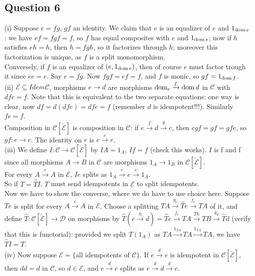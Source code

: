 \documentclass[a4paper]{article}
\begin{document}
\subsection{Question 6}
(i) Suppose $e = fg$, $gf$ an identity. We claim that $e$ is an equalizer of $e$ and $1_{\operatorname{dom} e}$: we have $ef = fgf = f$, so $f$ has equal composites with $e$ and $1_{\operatorname{dom} e}$; now if $h$ satisfies $eh = h$, then $h = fgh$, so it factorizes through $h$; moreover this factorization is unique, as $f$ is a split monomorphism.\\
Conversely, if $f$ is an equalizer of $(e,1_{\operatorname{dom} e})$, then of course $e$ must factor trough it since $ee = e$. Say $e=fg$. Now $fgf = ef = f$, and $f$ is monic, so $gf = 1_{\operatorname{dom} f}$.\\
(ii) $\mathcal{E} \subseteq Idem \mathcal{C}$, morphisms $e \to d$ are morphisms $\operatorname{dom}_e \xrightarrow{f} \operatorname{dom} d$ in $\mathcal{C}$ with $dfe = f$. Note that this is equivalent to the two separate equations: one way is clear, now $df=d(dfe) = dfe = f$ (remember $d$ is idempotent!!!). Similarly $fe = f$.\\
Composition in $\mathcal{C}[\check{\mathcal{E}}]$ is composition in $\mathcal{C}$: if $e \xrightarrow{f} d \xrightarrow{g} c$, then $cgf = gf = gfe$, so $gf : e \to c$. The identity on $e$ is $e \xrightarrow{e} e$.\\
(iii) We define $I:\mathcal{C} \to \mathcal{C} [\check{\mathcal{E}}]$ by $IA = 1_A$, $If = f$ (check this works). $I$ is f and f since all morphisms $A \to B$ in $\mathcal{C}$ are morphisms $1_A \to 1_B$ in $\mathcal{C} [\check{\mathcal{E}}]$.\\
For every $A \xrightarrow{e} A$ in $\mathcal{E}$, $Ie$ splits as $1_A \xrightarrow{e} e \xrightarrow{e} 1_A$.\\
So if $T = \hat{T}I$, $T$ must send idempotents in $\mathcal{E}$ to split idempotents.\\
Now we have to show the converse, where we do have to use choice here. Suppose $Te$ is split for every $A \xrightarrow{e} A$ in $\mathcal{E}$. Choose a splitting $TA \xrightarrow{g_e} \hat{T}e \xrightarrow{f_e} TA$ of it, and define $\hat{T}: \mathcal{C} [\check{\mathcal{E}}] \to \mathcal{D}$ on morphisms by $\hat{T} (e \xrightarrow{h} d) = \hat{T} e \xrightarrow{f_e}TA \xrightarrow{Th} TB \xrightarrow{g_d} \hat{T}d$ (verify that this is functorial): provided we split $T(1_A)$ as $TA \xrightarrow{1_{TA}} TA \xrightarrow{1_{TA}} TA$, we have $\hat{T} I = T$.\\
(iv) Now suppose $\mathcal{E} = \{$all idempotents of $\mathcal{C}\}$. If $e \xrightarrow{d} e$ is idempotent in $\mathcal{C} [\check{\mathcal{E}}]$, then $dd = d$ in $\mathcal{C}$, so $d \in \mathcal{E}$, and $e \xrightarrow{d} e$ splits as $e \xrightarrow{d} d \xrightarrow{d} e$.\\
\end{document}
